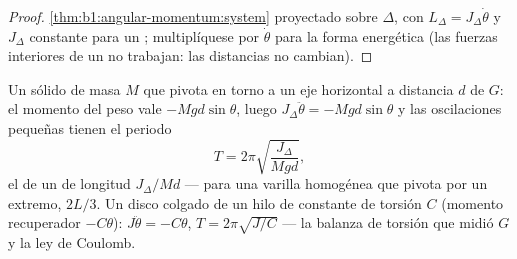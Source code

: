\begin{proof}
\cref{thm:b1:angular-momentum:system} proyectado sobre $\Delta$, con $L_\Delta
= J_\Delta\dot\theta$ y $J_\Delta$ constante para un ;
multiplíquese por $\dot\theta$ para la forma energética (las fuerzas
interiores de un  no trabajan: las distancias no cambian).
\end{proof}

\begin{example}\label{ex:b1:systems-of-points:pendulums}
Un sólido de masa $M$ que pivota en torno a un eje horizontal a distancia
$d$ de $G$: el momento del peso vale $-Mgd\sin\theta$, luego $J_\Delta\ddot\theta =
-Mgd\sin\theta$ y las oscilaciones pequeñas tienen el periodo
\[
T = 2\pi\sqrt{\frac{J_\Delta}{Mgd}} ,
\]
el de un  de longitud $J_\Delta/Md$ --- para una varilla
homogénea que pivota por un extremo, $2L/3$. Un disco colgado de un hilo
de constante de torsión $C$ (momento recuperador $-C\theta$):
$J\ddot\theta = -C\theta$, $T = 2\pi\sqrt{J/C}$ --- la balanza de torsión
que midió $G$ y la ley de Coulomb.
\end{example}

